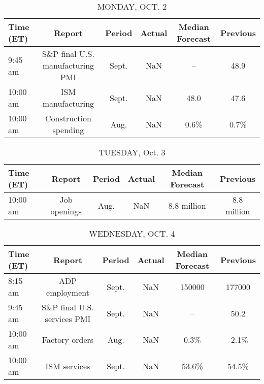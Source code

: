 \documentclass{article}%
\begin{document}
%
\normalsize%


\begin{table}[htbp]%
\caption{MONDAY, OCT. 2}%
\centering%
\begin{adjustbox}{width=1\textwidth}%
\begin{tabular}{lccccc}
\toprule
Time (ET) &                           Report & Period & Actual & Median Forecast & Previous \\
\midrule
  9:45 am & S\&P final U.S. manufacturing PMI &  Sept. &    NaN &              -- &     48.9 \\
 10:00 am &                ISM manufacturing &  Sept. &    NaN &            48.0 &     47.6 \\
 10:00 am &            Construction spending &   Aug. &    NaN &            0.6\% &     0.7\% \\
\bottomrule
\end{tabular}
%
\end{adjustbox}%
\end{table}

%


\begin{table}[htbp]%
\caption{TUESDAY, Oct. 3}%
\centering%
\begin{adjustbox}{width=1\textwidth}%
\begin{tabular}{lccccc}
\toprule
Time (ET) &       Report & Period & Actual & Median Forecast &    Previous \\
\midrule
 10:00 am & Job openings &   Aug. &    NaN &     8.8 million & 8.8 million \\
\bottomrule
\end{tabular}
%
\end{adjustbox}%
\end{table}

%


\begin{table}[htbp]%
\caption{WEDNESDAY, OCT. 4}%
\centering%
\begin{adjustbox}{width=1\textwidth}%
\begin{tabular}{lccccc}
\toprule
Time (ET) &                      Report & Period & Actual & Median Forecast & Previous \\
\midrule
  8:15 am &              ADP employment &  Sept. &    NaN &          150000 &   177000 \\
  9:45 am & S\&P final U.S. services PMI &  Sept. &    NaN &              -- &     50.2 \\
 10:00 am &              Factory orders &   Aug. &    NaN &            0.3\% &    -2.1\% \\
 10:00 am &                ISM services &  Sept. &    NaN &           53.6\% &    54.5\% \\
\bottomrule
\end{tabular}
%
\end{adjustbox}%
\end{table}
\end{document}
